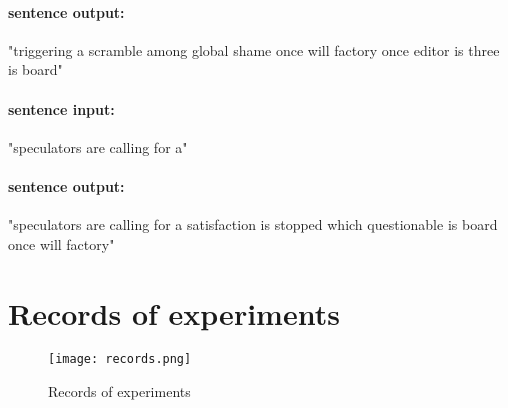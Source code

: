 \documentclass[11pt,a4paper]{article}
\begin{document}
\paragraph{sentence output:}
"triggering a scramble among global shame once will factory once editor is three is board" 

\paragraph{sentence input:}
"speculators are calling for a"
\paragraph{sentence output:}
"speculators are calling for a satisfaction is stopped which questionable is board once will factory"


\section{Records of experiments}

\begin{figure}[H] %
\centering 
\texttt{[image: records.png]} %
\caption{Records of experiments} 
\label{pic2}
\end{figure}
\end{document}
